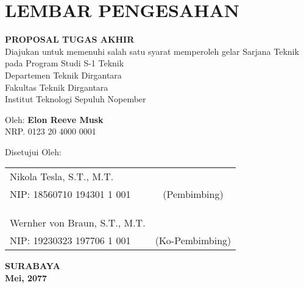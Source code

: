 \chapter*{LEMBAR PENGESAHAN}

\thispagestyle{empty}

\begin{center}
  \textbf{\tatitle}
\end{center}

\begingroup
\small

\begin{center}
  \textbf{PROPOSAL TUGAS AKHIR} \\
  Diajukan untuk memenuhi salah satu syarat memperoleh gelar
  Sarjana Teknik pada
  Program Studi S-1 Teknik  \\
  Departemen Teknik Dirgantara \\
  Fakultas Teknik Dirgantara \\
  Institut Teknologi Sepuluh Nopember
\end{center}

\begin{center}
  Oleh: \textbf{Elon Reeve Musk} \\
  NRP. 0123 20 4000 0001
\end{center}

\begin{center}
  Disetujui Oleh:
\end{center}

\vspace{10ex}

\begingroup
\setlength{\tabcolsep}{0pt}

\noindent
\begin{tabularx}{\textwidth}{X c}
  Nikola Tesla, S.T., M.T.      &                 \\
  NIP: 18560710 194301 1 001    & (Pembimbing)    \\
                                &                 \\
                                &                 \\
                                &                 \\
  Wernher von Braun, S.T., M.T. &                 \\
  NIP: 19230323 197706 1 001    & (Ko-Pembimbing) \\
\end{tabularx}
\endgroup

\vspace{\fill}

\begin{center}
  \textbf{SURABAYA} \\
  \textbf{Mei, 2077}
\end{center}
\endgroup
